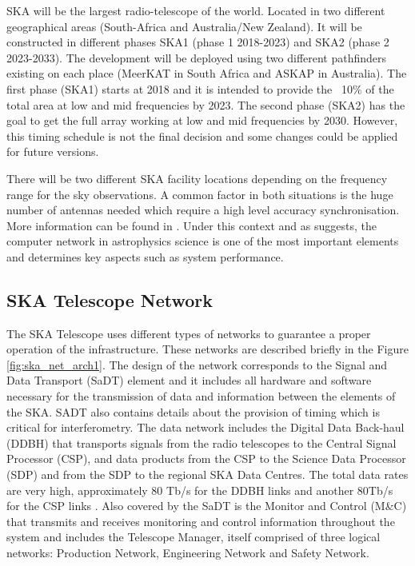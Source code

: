 SKA will be the largest radio-telescope of the world. Located in two different
geographical areas (South-Africa and Australia/New Zealand). It will be
constructed in different phases SKA1 (phase 1 2018-2023) and SKA2 (phase 2
2023-2033). The development will be deployed using two different pathfinders
existing on each place (MeerKAT in South Africa and ASKAP in Australia).  The
first phase (SKA1) starts at 2018 and it is intended to provide the ~10\% of
the total area at low and mid frequencies by 2023. The second phase (SKA2) has
the goal to get the full array working at low and mid frequencies by 2030.
However, this timing schedule is not the final decision and some changes could
be applied for future versions.

There will be two different SKA facility locations depending on the frequency
range for the sky observations. A common factor in both situations is the huge
number of antennas needed which require a high level accuracy synchronisation.
More information can be found in  \cite{ska:baseline_description_v2}. Under
this context and as \cite{HUANG201727} suggests, the computer network in
astrophysics science is one of the most important elements and determines key
aspects such as system performance.

\subsection{SKA Telescope Network} \label{subsec:ska-telescope}

The SKA Telescope uses different types of networks to guarantee a proper
operation of the infrastructure. These networks are described briefly in the
Figure \ref{fig:ska_net_arch1}. The design of the network corresponds to the
Signal and Data Transport (SaDT) element \cite{ska:sadt_website} and it
includes all hardware and software necessary for the transmission of data and
information between the elements of the SKA. SADT also contains details about
the provision of timing which is critical for interferometry.  The data network
includes the Digital Data Back-haul (DDBH) that transports signals from the
radio telescopes to the Central Signal Processor (CSP), and data products from
the CSP to the Science Data Processor (SDP) and from the SDP to the regional
SKA Data Centres. The total data rates are very high, approximately 80 Tb/s for
the DDBH links and another 80Tb/s for the CSP links \cite{ska:consortia-news}.
Also covered by the SaDT is the Monitor and Control (M\&C) that transmits and
receives monitoring and control information throughout the system and includes
the Telescope Manager, itself comprised of three logical networks: Production
Network, Engineering Network and Safety Network.

